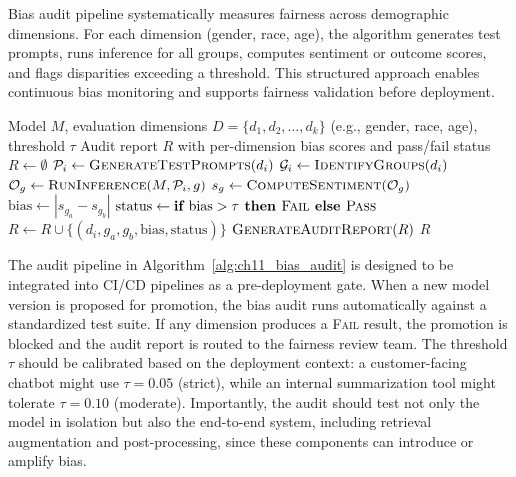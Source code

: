 \begin{llmalgobox}{Bias audit pipeline systematically measures fairness across demographic dimensions. For each dimension (gender, race, age), the algorithm generates test prompts, runs inference for all groups, computes sentiment or outcome scores, and flags disparities exceeding a threshold. This structured approach enables continuous bias monitoring and supports fairness validation before deployment.}
\label{alg:ch11_bias_audit}
\begin{algorithmic}[1]
\Require Model $M$, evaluation dimensions $D = \{d_1, d_2, \ldots, d_k\}$ (e.g., gender, race, age), threshold $\tau$
\Ensure Audit report $R$ with per-dimension bias scores and pass/fail status
\State $R \gets \emptyset$
    \State $\mathcal{P}_i \gets \textsc{GenerateTestPrompts}(d_i)$ 
    \State $\mathcal{G}_i \gets \textsc{IdentifyGroups}(d_i)$ 
        \State $\mathcal{O}_g \gets \textsc{RunInference}(M, \mathcal{P}_i, g)$ 
        \State $s_g \gets \textsc{ComputeSentiment}(\mathcal{O}_g)$ 
    \EndFor
        \State $\text{bias} \gets |s_{g_a} - s_{g_b}|$ 
        \State $\text{status} \gets \textbf{if } \text{bias} > \tau \textbf{ then } \textsc{Fail} \textbf{ else } \textsc{Pass}$
        \State $R \gets R \cup \{(d_i, g_a, g_b, \text{bias}, \text{status})\}$
    \EndFor
\EndFor
\State $\textsc{GenerateAuditReport}(R)$
\State \Return $R$
\end{algorithmic}
\end{llmalgobox}

The audit pipeline in Algorithm~\ref{alg:ch11_bias_audit} is designed to be integrated into CI/CD pipelines as a pre-deployment gate. When a new model version is proposed for promotion, the bias audit runs automatically against a standardized test suite. If any dimension produces a \textsc{Fail} result, the promotion is blocked and the audit report is routed to the fairness review team. The threshold $\tau$ should be calibrated based on the deployment context: a customer-facing chatbot might use $\tau = 0.05$ (strict), while an internal summarization tool might tolerate $\tau = 0.10$ (moderate). Importantly, the audit should test not only the model in isolation but also the end-to-end system, including retrieval augmentation and post-processing, since these components can introduce or amplify bias.

